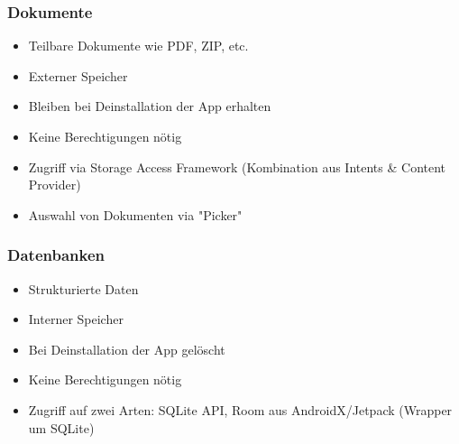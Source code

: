 \subsubsection{Dokumente}
\begin{itemize}[topsep=0pt, leftmargin=4mm]
    \setlength\itemsep{-0.3em}
    \item Teilbare Dokumente wie PDF, ZIP, etc.
    \item Externer Speicher
    \item Bleiben bei Deinstallation der App erhalten
    \item Keine Berechtigungen nötig
    \item Zugriff via Storage Access Framework (Kombination aus Intents \& Content Provider)
    \item Auswahl von Dokumenten via "Picker"
\end{itemize}
\subsubsection{Datenbanken}
\begin{itemize}[topsep=0pt, leftmargin=4mm]
    \setlength\itemsep{-0.3em}
    \item Strukturierte Daten
    \item Interner Speicher
    \item Bei Deinstallation der App gelöscht
    \item Keine Berechtigungen nötig
    \item Zugriff auf zwei Arten: SQLite API, Room aus AndroidX/Jetpack (Wrapper um SQLite)
\end{itemize}
